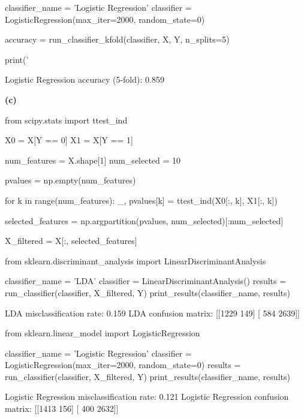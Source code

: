 \begin{python}
classifier_name = 'Logistic Regression'
classifier = LogisticRegression(max_iter=2000, random_state=0)

accuracy = run_classifier_kfold(classifier, X, Y, n_splits=5)

print('%
\end{python}

\begin{console}
Logistic Regression accuracy (5-fold): 0.859
\end{console}

\textbf{(c)}

\begin{python}
from scipy.stats import ttest_ind

X0 = X[Y == 0]
X1 = X[Y == 1]

num_features = X.shape[1]
num_selected = 10

pvalues = np.empty(num_features)

for k in range(num_features):
    _, pvalues[k] = ttest_ind(X0[:, k], X1[:, k])
    
selected_features = np.argpartition(pvalues, num_selected)[:num_selected]

X_filtered = X[:, selected_features]
\end{python}

\begin{python}
from sklearn.discriminant_analysis import LinearDiscriminantAnalysis

classifier_name = 'LDA'
classifier = LinearDiscriminantAnalysis()
results = run_classifier(classifier, X_filtered, Y)
print_results(classifier_name, results)
\end{python}

\begin{console}
LDA misclassification rate: 0.159
LDA confusion matrix:
[[1229  149]
 [ 584 2639]]
\end{console}

\begin{python}
from sklearn.linear_model import LogisticRegression

classifier_name = 'Logistic Regression'
classifier = LogisticRegression(max_iter=2000, random_state=0)
results = run_classifier(classifier, X_filtered, Y)
print_results(classifier_name, results)
\end{python}

\begin{console}
Logistic Regression misclassification rate: 0.121
Logistic Regression confusion matrix:
[[1413  156]
 [ 400 2632]]
\end{console}

